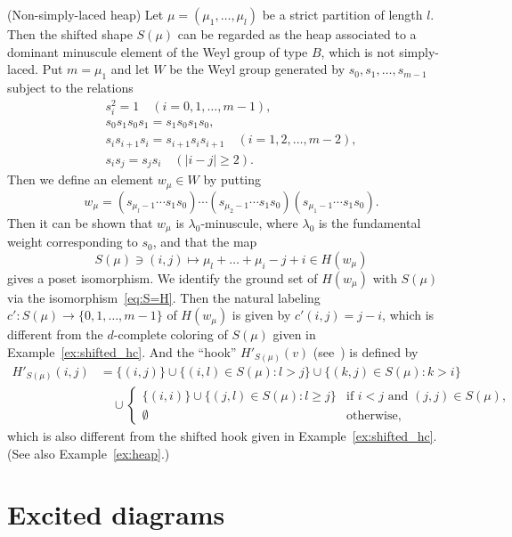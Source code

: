 \documentclass[ALCO,ThmDefs,Unicode,epreuves]{cedram}
\begin{document}
\begin{exam} (Non-simply-laced heap)
\label{ex:shifted-B}
Let $\mu = (\mu_1, \dots, \mu_l)$ be a strict partition of length $l$.
Then the shifted shape $S(\mu)$ can be regarded as 
the heap associated to a dominant minuscule element of the Weyl group of type $B$,
which is not simply-laced.
Put $m = \mu_1$ and let $W$ be the Weyl group generated by $s_0, s_1, \dots, s_{m-1}$ 
subject to the relations
\begin{gather*}
s_i^2 = 1 \quad(i=0, 1, \dots, m-1),
\\
s_0 s_1 s_0 s_1 = s_1 s_0 s_1 s_0,
\\
s_i s_{i+1} s_i = s_{i+1} s_i s_{i+1} \quad(i=1, 2, \dots, m-2),
\\
s_i s_j = s_j s_i \quad(|i-j| \ge 2).
\end{gather*}
Then we define an element $w_\mu \in W$ by putting
$$
w_\mu = (s_{\mu_l-1} \cdots s_1 s_0) \cdots (s_{\mu_2-1} \cdots s_1 s_0) (s_{\mu_1-1} \cdots s_1 s_0).
$$
Then it can be shown that $w_\mu$ is $\lambda_0$-minuscule, where $\lambda_0$ is the fundamental weight 
corresponding to $s_0$, and that the map
\begin{equation}
\label{eq:S=H}
S(\mu) \ni (i,j) \mapsto \mu_l + \dots + \mu_i - j + i \in H(w_\mu)
\end{equation}
gives a poset isomorphism.
We identify the ground set of $H(w_\mu)$ with $S(\mu)$ via the isomorphism~\eqref{eq:S=H}.
Then the natural labeling $c' : S(\mu) \to \{ 0, 1, \dots, m-1 \}$ of $H(w_\mu)$ is given by 
$c'(i,j) = j-i$, which is different from the $d$-complete coloring of $S(\mu)$ given 
in Example~\ref{ex:shifted_hc}.
And the ``hook'' $H'_{S(\mu)}(v)$ (see~\cite[Definition~4.8]{N2}) is defined by
\begin{align*}
H'_{S(\mu)}(i,j)
 &=
\{ (i,j) \}
 \cup
\{ (i,l) \in S(\mu) : l > j \}
 \cup
\{ (k,j) \in S(\mu) : k > i \}
\\
 &\quad
\cup
\begin{cases}
 \{ (i,i) \} \cup \{ (j,l) \in S(\mu) : l \ge j \} &\text{if $i<j$ and $(j,j) \in S(\mu)$,} \\
 \emptyset &\text{otherwise,}
\end{cases}
\end{align*}
which is also different from the shifted hook given in Example~\ref{ex:shifted_hc}.
(See also Example~\ref{ex:heap}.)
\end{exam}

\section{%
Excited diagrams
}\label{sect3}
\end{document}
